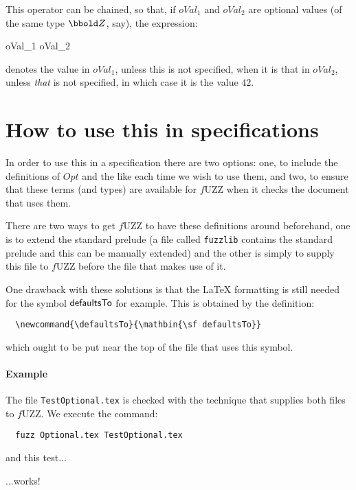 \documentclass[a4paper,titlepage,twoside,12pt]{article}
\begin{document}
This operator can be chained, so that, if $oVal_1$ and $oVal_2$ are optional values (of the same type $\num$, say), the expression:
\begin{zed}
	oVal_1  oVal_2 
\end{zed}
denotes the value in $oVal_1$, unless this is not specified, when it is that in $oVal_2$, unless \emph{that} is not specified, in which case it is the value $42$.

\section{How to use this in specifications}
In order to use this in a specification there are two options: one, to include the definitions of $Opt$ and the like each time we wish to use them, and two, to ensure that these terms (and types) are available for $f$UZZ when it checks the document that uses them.

There are two ways to get $f$UZZ to have these definitions around beforehand, one is to extend the standard prelude (a file called \texttt{fuzzlib} contains the standard prelude and this can be manually extended) and the other is simply to supply this file to $f$UZZ before the file that makes use of it.

One drawback with these solutions is that the LaTeX formatting is still needed for the symbol $\defaultsTo$ for example. This  is obtained by the definition:
\begin{verbatim}
  \newcommand{\defaultsTo}{\mathbin{\sf defaultsTo}}
\end{verbatim}
which ought to be put near the top of the file that uses this symbol.

\paragraph{Example}
The file \texttt{TestOptional.tex} is checked with the technique that supplies both files to $f$UZZ. We execute the command:
\begin{verbatim}
  fuzz Optional.tex TestOptional.tex
\end{verbatim}
and this test...

...works!
\end{document}
